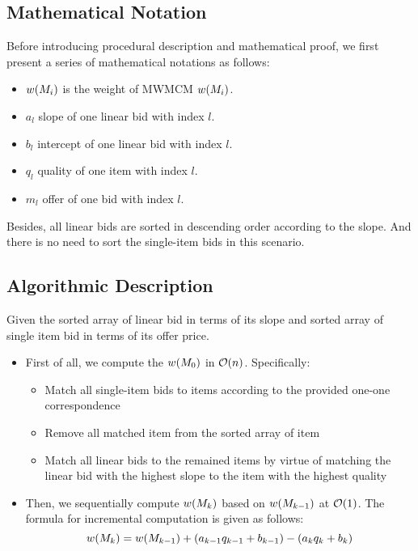 \documentclass[11pt,a4paper]{article}
\begin{document}
\subsection{Mathematical Notation}
Before introducing procedural description and mathematical proof, we first
present a series of mathematical notations as follows: 
\begin{itemize}
    \item{$w(M_i)$ is the weight of MWMCM $w(M_i)$.}
    \item{$a_l$ slope of one linear bid with index $l$.}
    \item{$b_l$ intercept of one linear bid with index $l$.}
    \item{$q_l$ quality of one item with index $l$.}
    \item{$m_l$ offer of one bid with index $l$.}
\end{itemize}

Besides, all linear bids are sorted in descending order according to the
slope. And there is no need to sort the single-item bids in this scenario. 

\subsection{Algorithmic Description}
Given the sorted array of linear bid in terms of its slope and sorted array of
single item bid in terms of its offer price. 

\begin{itemize}
    \item{First of all, we compute the $w(M_{0})$ in $\mathcal{O}(n)$.
        Specifically: }
        \begin{itemize}
        \item{Match all single-item bids to items according to the provided
            one-one correspondence}
        \item{Remove all matched item from the sorted array of item}
        \item{Match all linear bids to the remained items by virtue of
                matching the linear bid with the highest slope to the item
            with the highest quality}
        \end{itemize}

    \item{Then, we sequentially compute $w(M_{k})$ based on $w(M_{k-1})$ at
        $\mathcal{O}(1)$. The formula for incremental computation is given as
    follows: }
    $$
    w(M_{k}) = w(M_{k-1}) + (a_{k-1} q_{k-1} + b_{k-1}) 
        - (a_k q_k + b_k)
    $$
\end{itemize}
 
\end{document}
